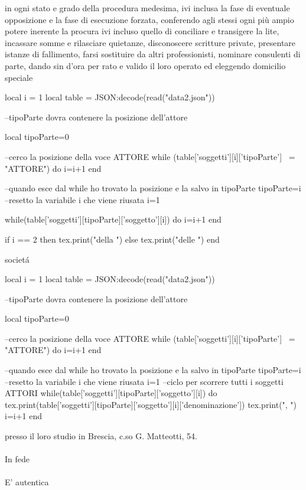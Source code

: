 \documentclass{article}
\begin{document}
in ogni stato e grado della procedura medesima, ivi inclusa la fase di eventuale opposizione e la fase di esecuzione forzata, conferendo agli stessi ogni pi\`u ampio potere inerente la procura ivi incluso quello di conciliare e transigere la lite, incassare somme e rilasciare quietanze, disconoscere scritture private, presentare istanze di fallimento, farsi sostituire da altri professionisti, nominare consulenti di parte, dando sin d'ora per rato e valido il loro operato ed eleggendo domicilio speciale 
\begin{luacode}
 local i = 1
 local table = JSON:decode(read("data2.json"))
 
--tipoParte dovra contenere la posizione dell'attore

 local tipoParte=0
 
 --cerco la posizione della voce ATTORE
 while (table['soggetti'][i]['tipoParte'] ~= "ATTORE") do
  i=i+1
 end
 
 --quando esce dal while ho trovato la posizione e la salvo in tipoParte
 tipoParte=i
 --resetto la variabile i che viene riusata
 i=1

 
  while(table['soggetti'][tipoParte]['soggetto'][i]) do
  i=i+1
  end
  
  if i == 2 then
  tex.print("della	")
  else
  tex.print("delle	")
  end
\end{luacode}
societ\'a
\begin{luacode}
 local i = 1
 local table = JSON:decode(read("data2.json"))
 
--tipoParte dovra contenere la posizione dell'attore

 local tipoParte=0
 
 --cerco la posizione della voce ATTORE
 while (table['soggetti'][i]['tipoParte'] ~= "ATTORE") do
  i=i+1
 end
 
 --quando esce dal while ho trovato la posizione e la salvo in tipoParte
 tipoParte=i
 --resetto la variabile i che viene riusata
 i=1
 --ciclo per scorrere tutti i soggetti ATTORI
 while(table['soggetti'][tipoParte]['soggetto'][i]) do
 tex.print(table['soggetti'][tipoParte]['soggetto'][i]['denominazione'])
 tex.print(",	")
 i=i+1
 end
\end{luacode}
presso il loro studio in Brescia, c.so G. Matteotti, 54.\\
\vspace*{0.3cm}\\
In fede\\
\vspace*{0.3cm}\\
\hspace*{12cm}E' autentica 
\end{document}
